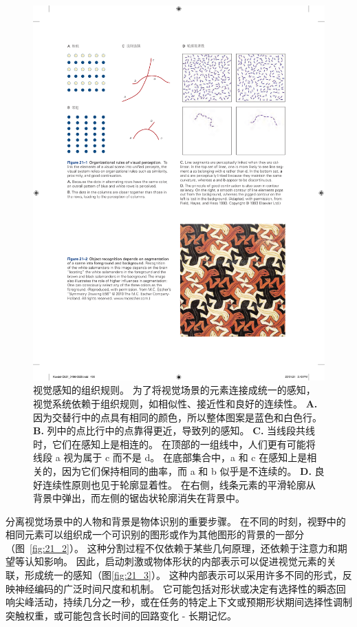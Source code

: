 \begin{figure}[htbp]
	\centering
	\includegraphics[width=1.0\linewidth]{chap21/fig_21_1}
	\caption{视觉感知的组织规则。
		为了将视觉场景的元素连接成统一的感知，视觉系统依赖于组织规则，如相似性、接近性和良好的连续性。
		\textbf{A.} 因为交替行中的点具有相同的颜色，所以整体图案是蓝色和白色行。
		\textbf{B.} 列中的点比行中的点靠得更近，导致列的感知。
		\textbf{C.} 当线段共线时，它们在感知上是相连的。
		在顶部的一组线中，人们更有可能将线段 a 视为属于 c 而不是 d。
		在底部集合中，a 和 c 在感知上是相关的，因为它们保持相同的曲率，而 a 和 b 似乎是不连续的。
		\textbf{D.} 良好连续性原则也见于轮廓显着性。
		在右侧，线条元素的平滑轮廓从背景中弹出，而左侧的锯齿状轮廓消失在背景中\cite{field1993contour}。}
	\label{fig:21_1}
\end{figure}


分离视觉场景中的人物和背景是物体识别的重要步骤。
在不同的时刻，视野中的相同元素可以组织成一个可识别的图形或作为其他图形的背景的一部分（图~\ref{fig:21_2}）。
这种分割过程不仅依赖于某些几何原理，还依赖于注意力和期望等认知影响。
因此，启动刺激或物体形状的内部表示可以促进视觉元素的关联，形成统一的感知（图\ref{fig:21_3}）。
这种内部表示可以采用许多不同的形式，反映神经编码的广泛时间尺度和机制。
它可能包括对形状或决定有选择性的瞬态回响尖峰活动，持续几分之一秒，或在任务的特定上下文或预期形状期间选择性调制突触权重，或可能包含长时间的回路变化 - 长期记忆。


